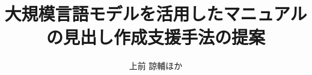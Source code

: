 \documentclass[a4paper,10pt]{ltjsarticle}
\begin{document}
\title{大規模言語モデルを活用したマニュアルの見出し作成支援手法の提案}
\author{上前 諒輔ほか}
\date{}
\maketitle

{\small

}
\end{document}
